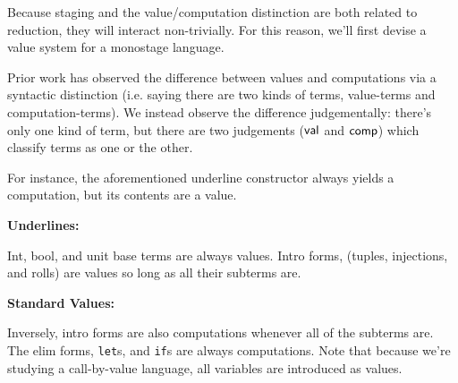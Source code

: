 \documentclass[]{article}
\begin{document}
\begin{abstrsyn}
Because staging and the value/computation distinction are both related to reduction, they will interact non-trivially.
For this reason, we'll first devise a value system for a monostage language.

Prior work has observed the difference between values and computations
via a syntactic distinction (i.e. saying there are two kinds of terms, value-terms and computation-terms).
We instead observe the difference judgementally: there's only one kind of term, 
but there are two judgements ($\mathsf{val}$ and $\mathsf{comp}$) which classify terms as one or the other.

For instance, the aforementioned underline constructor always yields a computation,
but its contents are a value.

\begin{framed}
\noindent\textbf{Underlines:}
\end{framed}

Int, bool, and unit base terms are always values.  
Intro forms, (tuples, injections, and rolls) are values so long as all their subterms are.

\begin{framed}
\noindent\textbf{Standard Values:}
\end{framed}

Inversely, intro forms are also computations whenever all of the subterms are.
The elim forms, {\tt let}s, and {\tt if}s are always computations.
Note that because we're studying a call-by-value language, all variables are introduced as values.


\end{abstrsyn}
\end{document}
